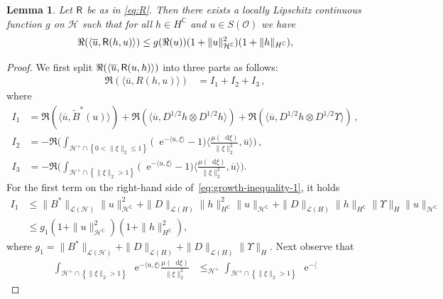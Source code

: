 \documentclass[10pt,a4paper]{amsart}
\newtheorem{lemma}{Lemma}
\newcommand*\D{\mathop{}\!\mathrm{d}}
\newcommand*\E{\mathop{}\!\mathrm{e}}
\newcommand{\MC}{\mathbb{C}}
\newcommand{\cH}{\mathcal{H}}
\newcommand{\cHplus}{\cH^{+}}
\newcommand{\cL}{\mathcal{L}}
\newcommand{\cO}{\mathcal{O}}
\newcommand{\norm}[1]{\|#1\|}
\newcommand{\set}[1]{\left\{ #1\right\}}
\begin{document}
\begin{lemma}\label{lem:growth-inequality}
Let ${\sf R}$ be as in \eqref{eq:R}. Then there exists a locally Lipschitz continuous function $g$ on $\cH$ such that
for all $h\in H^{\MC}$ and $u\in S(\cO)$ we have
\begin{align}\label{eq:growth-inequality}
  \Re(\langle \overline{u} , {\sf R}(h,u)\rangle)\leq g(\Re(u))(1+\norm{u}_{\cH^{\mathbb{C}}}^{2})(1+\norm{h}_{H^{\mathbb{C}}}),
\end{align}
\end{lemma}

\begin{proof}
  We first split $\Re(\langle \overline{u} , {\sf R}(u,h)\rangle)$ into three parts as follows:
  \begin{align}\label{eq:growth-inequality-1}
   \Re(\langle \overline{u},R(h,u)\rangle)&= I_1 + I_2+ I_3\,,
   \end{align}
   where
   \begin{align*}
   I_1&=  \Re(\langle \overline{u},
    \tilde{B}^{*}(u)\rangle)+\Re(\langle \overline{u}, D^{1/2}h\otimes D^{1/2}h\rangle) + \Re(\langle \overline{u}, D^{1/2}h\otimes D^{1/2}\Upsilon \rangle)\,, \\
    I_2 &= -\Re\Big(\int_{\cHplus\cap\set{0<\norm{\xi}_2\leq 1}}\big(\E^{-\langle
      u,\xi\rangle}-1\big)\langle\frac{\mu(\D\xi)}{\norm{\xi}_2^{2}},\overline{u}\rangle\Big)\,,\\
    I_3 &=  -\Re\Big(\int_{\cHplus\cap\set{\norm{\xi}_2>1}}\big(\E^{-\langle
      u,\xi\rangle}-1\big)\langle\frac{\mu(\D\xi)}{\norm{\xi}_2^{2}},\overline{u}\rangle\Big).
  \end{align*}
  For the first term on the right-hand side of~\eqref{eq:growth-inequality-1}, it holds
  \begin{align*}
    I_1&\leq
                      \norm{B^{*}}_{\cL(\cH)}\norm{u}^{2}_{\cH^{\mathbb{C}}}+\norm{D}_{\cL(H)}\norm{h}_{H^{\MC}}^{2}\norm{u}_{\cH^{\mathbb{C}}} + \norm{D}_{\cL(H)}\norm{h}_{H^{\MC}}\norm{\Upsilon}_{H}\norm{u}_{\cH^{\mathbb{C}}}\\
                    &\leq g_{1}(1+\norm{u}_{\cH^{\mathbb{C}}}^{2})(1+\norm{h}_{H^{\MC}}^{2}), 
  \end{align*}
  where $g_{1}=\norm{B^{*}}_{\cL(\cH)}+\norm{D}_{\cL(H)} +\norm{D}_{\cL(H)} \norm{\Upsilon}_H$. 
  Next observe that 
  \begin{align}\label{eq:big-jumps}
  \int_{\cHplus\cap\set{\norm{\xi}_2>1}}\E^{-\langle
    u,\xi\rangle} \frac{\mu(\D\xi)}{\norm{\xi}_2^{2}} &\leq_{\cHplus} \int_{\cHplus\cap\set{\norm{\xi}_2>1}}\E^{-\langle
}
\end{align}
\end{proof}
\end{document}
